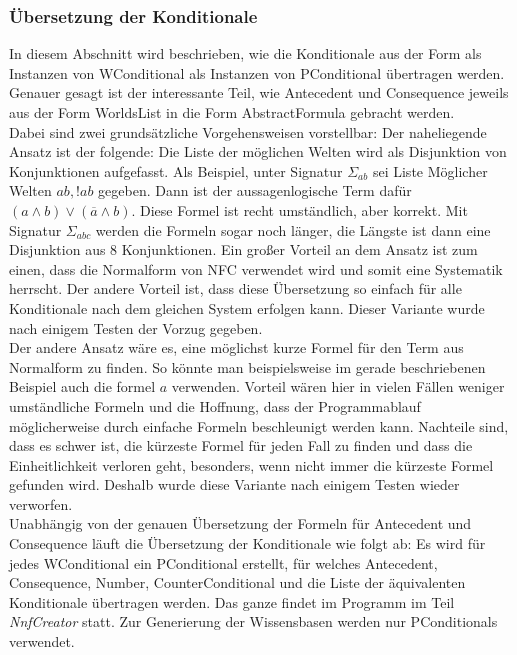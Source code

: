 \documentclass[12pt,a4paper]{article}
\begin{document}
\subsubsection{Übersetzung der Konditionale}
\label{sec:übersetzung}
In diesem Abschnitt wird beschrieben, wie die Konditionale aus der Form als Instanzen von WConditional als Instanzen von PConditional übertragen werden. Genauer gesagt ist der interessante Teil, wie Antecedent und Consequence jeweils aus der Form WorldsList in die Form AbstractFormula gebracht werden. \\
Dabei sind zwei grundsätzliche Vorgehensweisen vorstellbar: Der naheliegende Ansatz ist der folgende: Die Liste der möglichen Welten wird als Disjunktion von Konjunktionen aufgefasst. Als Beispiel, unter Signatur $\Sigma_{ab}$ sei Liste Möglicher Welten $ab, !ab$ gegeben. Dann ist der aussagenlogische Term dafür $(a \wedge b) \vee (\overline{a}\wedge b)$. Diese Formel ist recht umständlich, aber korrekt. Mit Signatur $\Sigma_{abc}$  werden die Formeln sogar noch länger, die Längste ist dann eine Disjunktion aus 8 Konjunktionen. Ein großer Vorteil an dem Ansatz ist zum einen, dass die Normalform von NFC verwendet wird und somit eine Systematik herrscht. Der andere Vorteil ist, dass diese Übersetzung so einfach für alle Konditionale nach dem gleichen System erfolgen kann. Dieser Variante wurde nach einigem Testen der Vorzug gegeben.\\
Der andere Ansatz wäre es, eine möglichst kurze Formel für den Term aus Normalform zu finden. So könnte man beispielsweise im gerade beschriebenen Beispiel auch die formel $a$ verwenden. Vorteil wären hier in vielen Fällen weniger umständliche Formeln und die Hoffnung, dass der Programmablauf möglicherweise durch einfache Formeln beschleunigt werden kann. Nachteile sind, dass es schwer ist, die kürzeste Formel für jeden Fall zu finden und dass die Einheitlichkeit verloren geht, besonders, wenn nicht immer die kürzeste Formel gefunden wird. Deshalb wurde diese Variante nach einigem Testen wieder verworfen. \\
Unabhängig von der genauen Übersetzung der Formeln für Antecedent und Consequence läuft die Übersetzung der Konditionale wie folgt ab: Es wird für jedes WConditional ein PConditional erstellt, für welches Antecedent, Consequence, Number, CounterConditional und die Liste der äquivalenten Konditionale übertragen werden. Das ganze findet im Programm im Teil \textit{NnfCreator} statt. Zur Generierung der Wissensbasen werden nur PConditionals verwendet. \\
\end{document}
